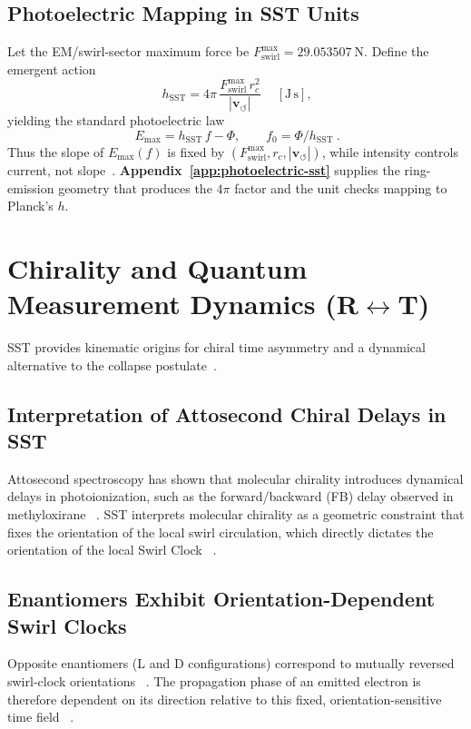 \documentclass[10pt,reprint,aps,onecolumn,nofootinbib]{revtex4-2}
\begin{document}
    \subsection*{Photoelectric Mapping in SST Units}\label{subsec:photoelectric-sst}
        Let the EM/swirl-sector maximum force be \(F_{\text{swirl}}^{\max}=29.053507~\mathrm{N}\).
        Define the emergent action
        \[
            \boxed{~
            h_{\mathrm{SST}}=4\pi\,\frac{F_{\text{swirl}}^{\max}\,r_c^{2}}{|\mathbf{v}_{\!\boldsymbol{\circlearrowleft}}|}
            ~}\quad [\mathrm{J\,s}],
        \]
        yielding the standard photoelectric law
        \[
            \boxed{~ E_{\max}=h_{\mathrm{SST}}\,f-\Phi,\qquad f_{0}=\Phi/h_{\mathrm{SST}} ~}.
        \]
        Thus the slope of \(E_{\max}(f)\) is fixed by \((F_{\text{swirl}}^{\max}, r_c, |\mathbf{v}_{\!\boldsymbol{\circlearrowleft}}|)\), while intensity controls current, not slope~\cite{Einstein1905}.
        \textbf{Appendix~\ref{app:photoelectric-sst}} supplies the ring-emission geometry that produces the \(4\pi\) factor and the unit checks mapping to Planck’s \(h\).


    \section{Chirality and Quantum Measurement Dynamics (R\texorpdfstring{$\leftrightarrow$}{↔}T)}\label{sec:chirality}
    SST provides kinematic origins for chiral time asymmetry and a dynamical alternative to the collapse postulate~\cite{sstCanon}.

        \subsection*{Interpretation of Attosecond Chiral Delays in SST}
            Attosecond spectroscopy has shown that molecular chirality introduces dynamical delays in photoionization, such as the forward/backward (FB) delay observed in methyloxirane~ \cite{Nahon2020}. SST interprets molecular chirality as a geometric constraint that fixes the orientation of the local swirl circulation, which directly dictates the orientation of the local Swirl Clock~ \cite{sstAttosecondPhotoionization}.

        \subsection*{Enantiomers Exhibit Orientation-Dependent Swirl Clocks}
            Opposite enantiomers (L and D configurations) correspond to mutually reversed swirl-clock orientations~ \cite{sstAttosecondPhotoionization}. The propagation phase of an emitted electron is therefore dependent on its direction relative to this fixed, orientation-sensitive time field~ \cite{sstAttosecondPhotoionization}.
\end{document}
